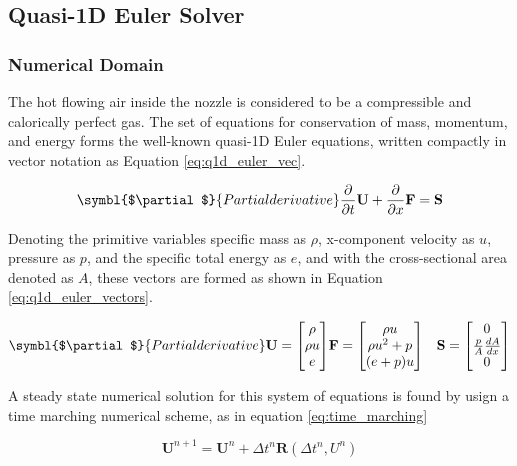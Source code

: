 \subsection{Quasi-1D Euler Solver}
\label{sec:q1d_euler}

\subsubsection{Numerical Domain}

The hot flowing air inside the nozzle is considered to be a compressible and calorically perfect gas. The set of equations for conservation of mass, momentum, and energy forms the well-known quasi-1D Euler equations, written compactly in vector notation as Equation \eqref{eq:q1d_euler_vec}.

\begin{equation}
    \symbl{$\partial$}{Partial derivative}
    \frac{\partial}{\partial t}{\mathbf{U}}  + \frac{\partial }{\partial x}\mathbf{F} = \mathbf{S} 
    \label{eq:q1d_euler_vec}
\end{equation}

Denoting the primitive variables specific mass as $\rho$, x-component velocity as $u$, pressure as $p$, and the specific total energy as $e$, and with the cross-sectional area denoted as $A$, these vectors are formed as shown in Equation \eqref{eq:q1d_euler_vectors}.

\begin{eqnarray}
    \symbl{$\partial$}{Partial derivative}
    \mathbf{U} = \begin{bmatrix} \rho \\ \rho u \\ e \end{bmatrix} & \mathbf{F} = \begin{bmatrix} \rho u \\ \rho u^2 + p \\ (e+p)u \end{bmatrix} & \mathbf{S} = \begin{bmatrix} 0 \\ \frac{p}{A} \frac{dA}{dx} \\ 0 \end{bmatrix}
    \label{eq:q1d_euler_vectors}
\end{eqnarray}

A steady state numerical solution for this system of equations is found by usign a time marching numerical scheme, as in equation \eqref{eq:time_marching}

\begin{equation}
   \mathbf{U}^{n+1} = \mathbf{U}^{n} + \Delta t^n \mathbf{R} (\Delta t^n, U^n) 
   \label{eq:time_marching}
\end{equation}

